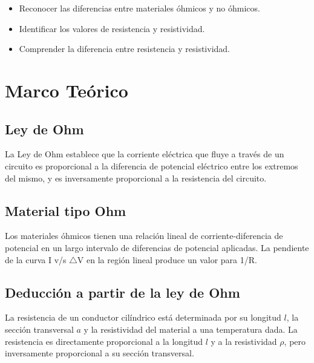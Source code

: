 \documentclass[10pt]{article}
\begin{document}
\begin{multicols}{2}
	\begin{itemize}
		\item Reconocer las diferencias entre materiales óhmicos y no óhmicos.
		\item Identificar los valores de resistencia y resistividad.
		\item Comprender la diferencia entre resistencia y resistividad.
	\end{itemize}



	\section{Marco Teórico}

	\subsection*{Ley de Ohm}

	La Ley de Ohm establece que la corriente eléctrica que fluye a través de un
	circuito es proporcional a la diferencia de potencial eléctrico entre los
	extremos del mismo, y es inversamente proporcional a la resistencia del
	circuito.~\cite{LeyDeOhm}

	\subsection*{Material tipo Ohm}

	Los materiales óhmicos tienen una relación lineal de corriente-diferencia de
	potencial en un largo intervalo de diferencias de potencial aplicadas.
	La pendiente de la curva I v/s $\triangle$V en la región lineal produce un
	valor para 1/R.~\cite{MaterialesOhmicos}

	\subsection*{Deducción a partir de la ley de Ohm}

	La resistencia de un conductor cilíndrico está determinada por su longitud $l$,
	la sección transversal $a$ y la resistividad del material a una temperatura dada.
	La resistencia es directamente proporcional a la longitud $l$ y a la
	resistividad $\rho$, pero inversamente proporcional a su sección transversal.


\end{multicols}
\end{document}
